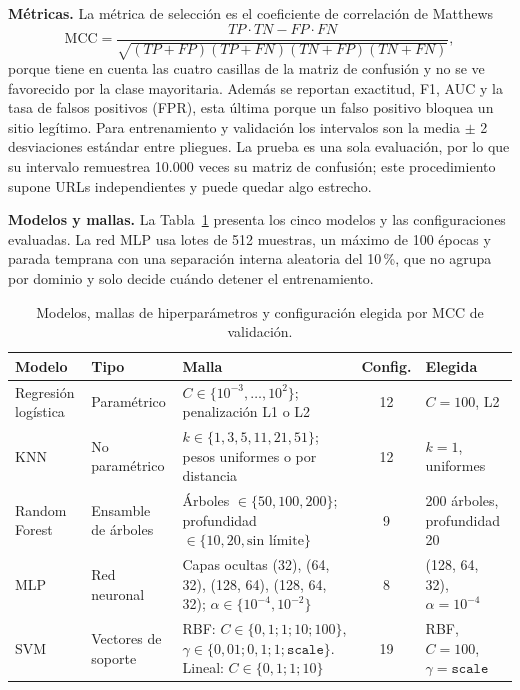 \documentclass[journal]{IEEEtran}
\begin{document}
\textbf{Métricas.} La métrica de selección es el coeficiente de correlación de Matthews
\begin{equation}
\mathrm{MCC}=\frac{TP\cdot TN-FP\cdot FN}{\sqrt{(TP+FP)(TP+FN)(TN+FP)(TN+FN)}},
\end{equation}
porque tiene en cuenta las cuatro casillas de la matriz de confusión y no se ve favorecido por la
clase mayoritaria. Además se reportan exactitud, F1, AUC y la tasa de falsos positivos (FPR), esta
última porque un falso positivo bloquea un sitio legítimo. Para entrenamiento y validación los
intervalos son la media $\pm$ 2 desviaciones estándar entre pliegues. La prueba es una sola
evaluación, por lo que su intervalo remuestrea 10.000 veces su matriz de confusión; este
procedimiento supone URLs independientes y puede quedar algo estrecho.

\textbf{Modelos y mallas.} La Tabla~\ref{tab:mallas} presenta los cinco modelos y las
configuraciones evaluadas. La red MLP usa lotes de 512 muestras, un máximo de 100 épocas y parada
temprana con una separación interna aleatoria del 10\,\%, que no agrupa por dominio y solo decide
cuándo detener el entrenamiento.

\begin{table}[t]
\centering
\caption{Modelos, mallas de hiperparámetros y configuración elegida por MCC de validación.}
\label{tab:mallas}
\small
\begin{tabular}{p{2.7cm} p{2.2cm} p{6.3cm} c p{3.5cm}}
\toprule
\textbf{Modelo} & \textbf{Tipo} & \textbf{Malla} & \textbf{Config.} & \textbf{Elegida} \\
\midrule
Regresión logística & Paramétrico &
$C\in\{10^{-3},\dots,10^{2}\}$; penalización L1 o L2 & 12 & $C=100$, L2 \\
KNN & No paramétrico &
$k\in\{1,3,5,11,21,51\}$; pesos uniformes o por distancia & 12 & $k=1$, uniformes \\
Random Forest & Ensamble de árboles &
Árboles $\in\{50,100,200\}$; profundidad $\in\{10,20,\text{sin límite}\}$ & 9 &
200 árboles, profundidad 20 \\
MLP & Red neuronal &
Capas ocultas (32), (64, 32), (128, 64), (128, 64, 32); $\alpha\in\{10^{-4},10^{-2}\}$ & 8 &
(128, 64, 32), $\alpha=10^{-4}$ \\
SVM & Vectores de soporte &
RBF: $C\in\{0{,}1;1;10;100\}$, $\gamma\in\{0{,}01;0{,}1;1;\texttt{scale}\}$.
Lineal: $C\in\{0{,}1;1;10\}$ & 19 & RBF, $C=100$, $\gamma=\texttt{scale}$ \\
\bottomrule
\end{tabular}
\end{table}
\end{document}
